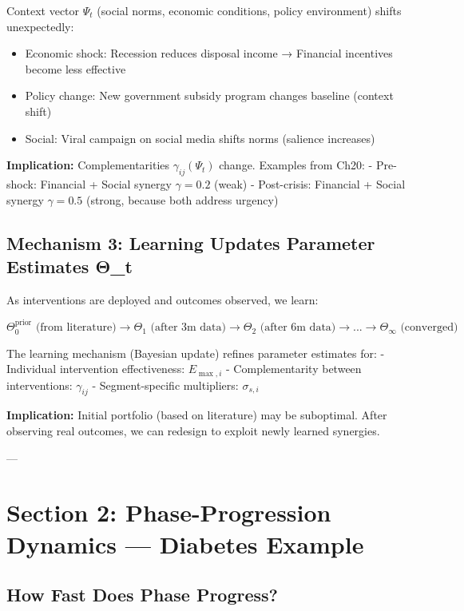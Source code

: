 Context vector $\Psi_t$ (social norms, economic conditions, policy environment) shifts unexpectedly:

\begin{itemize}[nosep]
\item Economic shock: Recession reduces disposal income → Financial incentives become less effective
\item Policy change: New government subsidy program changes baseline (context shift)
\item Social: Viral campaign on social media shifts norms (salience increases)
\end{itemize}

\textbf{Implication:} Complementarities $\gamma_{ij}(\Psi_t)$ change. Examples from Ch20:
- Pre-shock: Financial + Social synergy $\gamma = 0.2$ (weak)
- Post-crisis: Financial + Social synergy $\gamma = 0.5$ (strong, because both address urgency)

\subsection{Mechanism 3: Learning Updates Parameter Estimates Θ_t}

As interventions are deployed and outcomes observed, we learn:

\begin{equation}
\Theta_0^{\text{prior}} \text{ (from literature)} \to \Theta_1 \text{ (after 3m data)} \to \Theta_2 \text{ (after 6m data)} \to ... \to \Theta_\infty \text{ (converged)}
\label{eq:21-learning}
\end{equation}

The learning mechanism (Bayesian update) refines parameter estimates for:
- Individual intervention effectiveness: $E_{\max,i}$
- Complementarity between interventions: $\gamma_{ij}$
- Segment-specific multipliers: $\sigma_{s,i}$

\textbf{Implication:} Initial portfolio (based on literature) may be suboptimal. After observing real outcomes, we can redesign to exploit newly learned synergies.

---

\section{Section 2: Phase-Progression Dynamics — Diabetes Example}
\label{sec:21-phase-dynamics}

\subsection{How Fast Does Phase Progress?}

